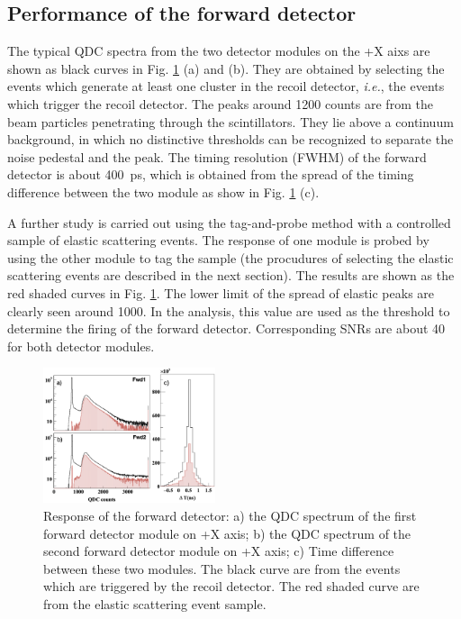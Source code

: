 \documentclass[number,5p]{elsarticle}
\begin{document}
\subsection{Performance of the forward detector}
\label{sec:fwd_performance}

The typical QDC spectra from the two detector modules on the +X aixs are shown as
black curves in Fig. \ref{fig:fwd_performance} (a) and (b).
They are obtained by selecting the events which generate at least one cluster in the recoil detector, \textit{i.e.}, the events which trigger the recoil detector.
The peaks around \num{1200} counts are from the beam particles penetrating through the scintillators.
They lie above a continuum background, in which no distinctive thresholds can be recognized to separate the noise pedestal and the peak.
The timing resolution (FWHM) of the forward detector is about \SI{400}{ps}, which is obtained from the spread of the timing difference between the two module as show in Fig. \ref{fig:fwd_performance} (c).

A further study is carried out using the tag-and-probe method with a controlled
sample of elastic scattering events.
The response of one module is probed by using the other module to tag the sample
(the procudures of selecting the elastic scattering events are described in the
next section).
The results are shown as the red shaded curves in Fig. \ref{fig:fwd_performance}.
The lower limit of the spread of elastic peaks are clearly seen around \num{1000}.
In the analysis, this value are used as the threshold to determine the firing of the forward detector.
Corresponding SNRs are about \num{40} for both detector modules.
\begin{figure}[htb!]
  \centering
  \includegraphics[width=0.45\textwidth]{./fwd_performance_elastic.png}
  \caption{Response of the forward detector: a) the QDC spectrum of the first forward detector module on +X axis;
    b) the QDC spectrum of the second forward detector module on +X axis; c) Time difference between these two modules.
    The black curve are from the events which are triggered by the recoil
    detector.
    The red shaded curve are from the elastic scattering event sample.
  }
  \label{fig:fwd_performance}
\end{figure}
\end{document}
